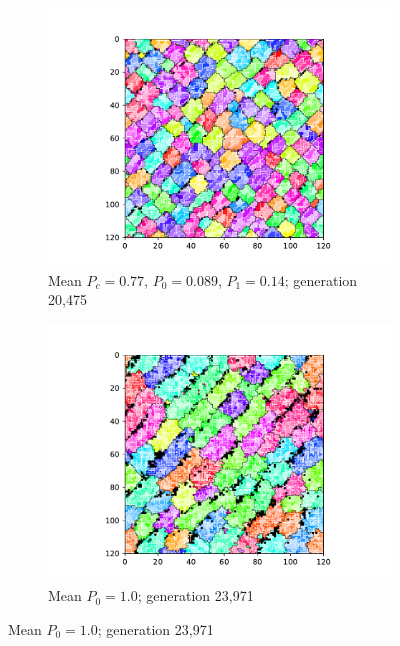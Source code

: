 \begin{figure}[t]
\begin{center}
\begin{subfigure}[b]{0.82\columnwidth}
  \includegraphics[width=\columnwidth,trim={2.5cm 0.5cm 2.5cm 1cm},clip]{img/ChannelMap_1022_update19500000}
  \caption{Mean $P_{c} = 0.77$, $P_0 = 0.089$, $P_1 = 0.14$; generation 20,475}
  \label{fig:ChannelMap_1022}
\end{subfigure}

\begin{subfigure}[b]{0.82\columnwidth}
  \includegraphics[width=\columnwidth,trim={2.5cm 0.5cm 2.5cm 1cm},clip]{img/ChannelMap_1041_update19500000}
  \caption{Mean $P_0 = 1.0$; generation 23,971}
  \label{fig:ChannelMap_1041}
\end{subfigure}


\end{center}
\end{figure}
